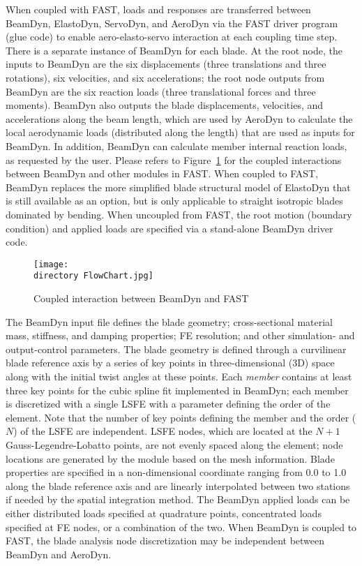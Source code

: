 When coupled with FAST, loads and responses are transferred between BeamDyn, ElastoDyn, ServoDyn, and AeroDyn via the FAST driver program (glue code) to enable aero-elasto-servo interaction at each coupling time step. 
There is a separate instance of BeamDyn for each blade. 
At the root node, the inputs to BeamDyn are the six displacements (three translations and three rotations), six velocities, and six accelerations; the root node outputs from BeamDyn are the six reaction loads (three translational forces and three moments). 
BeamDyn also outputs the blade displacements, velocities, and accelerations along the beam length, which are used by AeroDyn to calculate the local aerodynamic loads (distributed along the length) that are used as inputs for BeamDyn. 
In addition, BeamDyn can calculate member internal reaction loads, as requested by the user. 
Please refers to Figure~\ref{fig:FlowChart} for the coupled interactions between BeamDyn and other modules in FAST. When coupled to FAST, BeamDyn replaces the more simplified blade structural model of ElastoDyn that is still available as an option, but is only applicable to straight isotropic blades dominated by bending. 
When uncoupled from FAST, the root motion (boundary condition) and applied loads are specified via a stand-alone BeamDyn driver code.
\begin{figure}
    \centering
    \texttt{[image: \\directory FlowChart.jpg]}
    \caption{Coupled interaction between BeamDyn and FAST}
    \label{fig:FlowChart}
\end{figure}

The BeamDyn input file defines the blade geometry; cross-sectional material mass, stiffness, and damping properties; FE resolution; and other simulation- and output-control parameters. 
The blade geometry is defined through a curvilinear blade reference axis by a series of key points in three-dimensional (3D) space along with the initial twist angles at these points. 
Each \textit{member} contains at least three key points for the cubic spline fit implemented in BeamDyn; each member is discretized with a single LSFE with a parameter defining the order of the element. 
Note that the number of key points defining the member and the order ($N$) of the LSFE are independent.
LSFE nodes, which are located at the $N+1$ Gauss-Legendre-Lobatto points, are not evenly spaced along the element; node locations are generated by the module based on the mesh information. 
Blade properties are specified in a non-dimensional coordinate ranging from 0.0 to 1.0 along the blade reference axis and are linearly interpolated between two stations if needed by the spatial integration method. 
The BeamDyn applied loads can be either distributed loads specified at quadrature points,  concentrated loads specified at FE nodes, or a combination of the two.  When BeamDyn is coupled to FAST, the blade analysis node discretization may be independent between BeamDyn and AeroDyn.  

